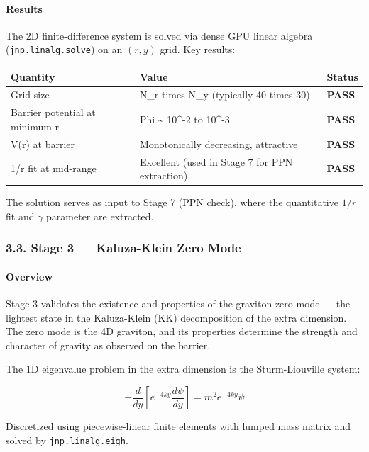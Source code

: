 \documentclass[
  11pt,
]{article}
\begin{document}
\bigskip

\hypertarget{results-1}{%
\paragraph{Results}\label{results-1}}

The 2D finite-difference system is solved via dense GPU linear algebra
(\texttt{jnp.linalg.solve}) on an \((r, y)\) grid. Key results:

\begin{longtable}[]{@{}lll@{}}
\toprule
Quantity & Value & Status\tabularnewline
\midrule
\endhead
Grid size & N\_r times N\_y (typically 40 times 30) &
\textbf{PASS}\tabularnewline
Barrier potential at minimum r & Phi \textasciitilde{} 10\^{}-2 to
10\^{}-3 & \textbf{PASS}\tabularnewline
V(r) at barrier & Monotonically decreasing, attractive &
\textbf{PASS}\tabularnewline
1/r fit at mid-range & Excellent (used in Stage 7 for PPN extraction) &
\textbf{PASS}\tabularnewline
\bottomrule
\end{longtable}

The solution serves as input to Stage 7 (PPN check), where the
quantitative \(1/r\) fit and \(\gamma\) parameter are extracted.

\bigskip

\hypertarget{stage-3-kaluza-klein-zero-mode}{%
\subsubsection{3.3. Stage 3 --- Kaluza-Klein Zero
Mode}\label{stage-3-kaluza-klein-zero-mode}}

\hypertarget{overview-2}{%
\paragraph{Overview}\label{overview-2}}

Stage 3 validates the existence and properties of the graviton zero mode
--- the lightest state in the Kaluza-Klein (KK) decomposition of the
extra dimension. The zero mode is the 4D graviton, and its properties
determine the strength and character of gravity as observed on the
barrier.

The 1D eigenvalue problem in the extra dimension is the Sturm-Liouville
system:

\[-\frac{d}{dy}\left[e^{-4ky}\frac{d\psi}{dy}\right] = m^2 e^{-4ky}\psi \tag{111}\]

Discretized using piecewise-linear finite elements with lumped mass
matrix and solved by \texttt{jnp.linalg.eigh}.
\end{document}
